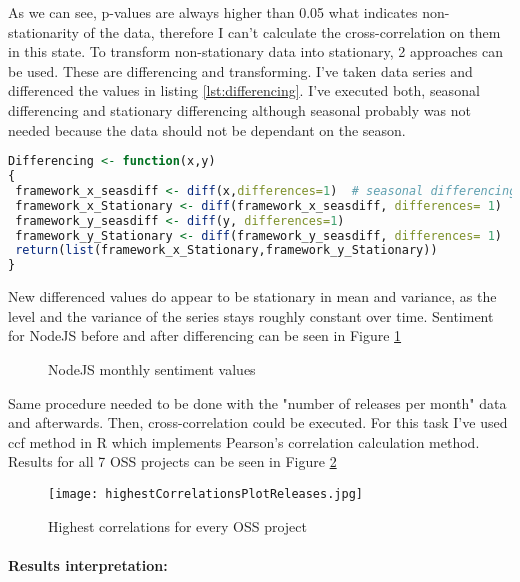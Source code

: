 As we can see, p-values are always higher than 0.05 what indicates non-stationarity of the data, therefore I can't calculate the cross-correlation on them in this state. To transform non-stationary data into stationary, 2 approaches can be used. These are differencing and transforming.  I've taken data series and differenced the values in listing \ref{lst:differencing}. I've executed both, seasonal differencing and stationary differencing although seasonal probably was not needed because the data should not be dependant on the season.

\begin{lstlisting}[caption={Used differencing method in R},label={lst:differencing},language=R]
Differencing <- function(x,y)
{
 framework_x_seasdiff <- diff(x,differences=1)  # seasonal differencing
 framework_x_Stationary <- diff(framework_x_seasdiff, differences= 1)
 framework_y_seasdiff <- diff(y, differences=1)
 framework_y_Stationary <- diff(framework_y_seasdiff, differences= 1)
 return(list(framework_x_Stationary,framework_y_Stationary))
}
\end{lstlisting}
New differenced values do appear to be stationary in mean and variance, as the level and the variance of the series stays roughly constant over time. Sentiment for NodeJS before and after differencing can be seen in Figure \ref{fig:NodeJS_Sentiment_before_after}

\begin{figure}[H]%
    \centering
    \qquad
    \caption{NodeJS monthly sentiment values}%
    \label{fig:NodeJS_Sentiment_before_after}%
\end{figure}

Same procedure needed to be done with the "number of releases per month" data and afterwards. Then, cross-correlation could be executed. For this task I've used ccf method in R which implements Pearson's correlation calculation method. Results for all 7 OSS projects can be seen in Figure \ref{fig:highestCorrelationsPlotReleases}

\begin{figure}[H]%
    \centering
	\texttt{[image: highestCorrelationsPlotReleases.jpg]}
    \caption{Highest correlations for every OSS project}%
    \label{fig:highestCorrelationsPlotReleases}%
\end{figure}

\paragraph{Results interpretation:}


